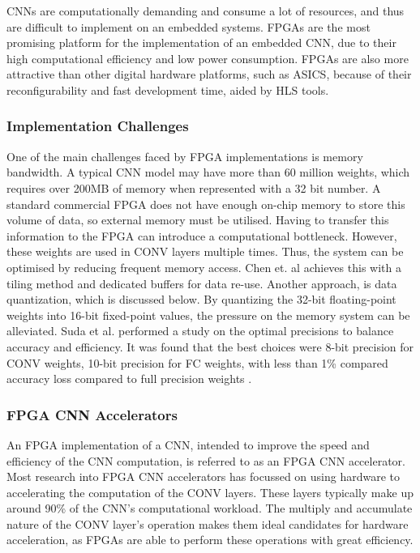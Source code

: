 \documentclass[12pt]{article}
\begin{document}
CNNs are computationally demanding and consume a lot of resources, and thus are difficult to implement on an embedded systems. FPGAs are the most promising platform for the implementation of an embedded CNN, due to their high computational efficiency and low power consumption. FPGAs are also more attractive than other digital hardware platforms, such as ASICS, because of their reconfigurability and fast development time, aided by HLS tools.

\subsubsection{Implementation Challenges}
\label{sec:Background-FpgaCnnImpl-Challenges}


One of the main challenges faced by FPGA implementations is memory bandwidth. A typical CNN model may have more than 60 million weights, which requires over 200MB of memory when represented with a 32 bit number. A standard commercial FPGA does not have enough on-chip memory to store this volume of data, so external memory must be utilised. Having to transfer this information to the FPGA can introduce a computational bottleneck. However, these weights are used in CONV layers multiple times. Thus, the system can be optimised by reducing frequent memory access. Chen et. al achieves this with a tiling method and dedicated buffers for data re-use. Another approach, is data quantization, which is discussed below. By quantizing the 32-bit floating-point weights into 16-bit fixed-point values, the pressure on the memory system can be alleviated. Suda et al. performed a study on the optimal precisions to balance accuracy and efficiency. It was found that the best choices were 8-bit precision for CONV weights, 10-bit precision for FC weights, with less than 1\% compared accuracy loss compared to full precision weights \cite{SudaFpgaAccelerator}.

\subsubsection{FPGA CNN Accelerators}
\label{sec:Background-FpgaCnnImpl-Accel}


An FPGA implementation of a CNN, intended to improve the speed and efficiency of the CNN computation, is referred to as an FPGA CNN accelerator. Most research into FPGA CNN accelerators has focussed on using hardware to accelerating the computation of the CONV layers. These layers typically make up around 90\% of the CNN's computational workload. The multiply and accumulate nature of the CONV layer's operation makes them ideal candidates for hardware acceleration, as FPGAs are able to perform these operations with great efficiency. 
\end{document}
